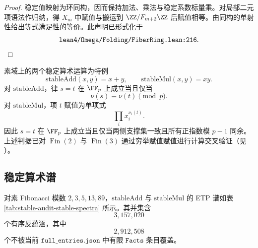 \documentclass[../../main.tex]{subfiles}
\begin{document}
\begin{proof}
稳定值映射为环同构，因而保持加法、乘法与稳定系数标量乘。对局部二元项语法作归纳，得 \(X_m\) 中赋值与搬运到 \(\ZZ/F_{m+2}\ZZ\) 后赋值相等。由同构的单射性给出等式满足性的等价。此声明已形式化于
\[
    \texttt{\detokenize{lean4/Omega/Folding/FiberRing.lean:216}}.
\]
\end{proof}

素域上的两个稳定算术运算为特例
\[
    \mathrm{stableAdd}(x,y)=x+y,\qquad
    \mathrm{stableMul}(x,y)=xy.
\]
对 \(\mathrm{stableAdd}\)，律 \(s=t\) 在 \(\FF_p\) 上成立当且仅当
\[
    \nu(s)\equiv \nu(t)\pmod p.
\]
对 \(\mathrm{stableMul}\)，项 \(t\) 赋值为单项式
\[
    \prod_i x_i^{\nu_i(t)}.
\]
因此 \(s=t\) 在 \(\FF_p\) 上成立当且仅当两侧支撑集一致且所有正指数模 \(p-1\) 同余。上述判据已对 \(\operatorname{Fin}(2)\) 与 \(\operatorname{Fin}(3)\) 通过穷举赋值赋值进行计算交叉验证（见 \texttt{}）。

\subsection{稳定算术谱}

\begin{theorem}\label{thm:stable-audit-stable-arithmetic-spectra}
对素 Fibonacci 模数 \(2,3,5,13,89\)，\(\mathrm{stableAdd}\) 与 \(\mathrm{stableMul}\) 的 ETP 谱如表 \ref{tab:stable-audit-stable-spectra} 所示。其并集含
\[
    3{,}157{,}020
\]
个有序反蕴涵，其中
\[
    2{,}912{,}508
\]
个不被当前 \(\texttt{full\_entries.json}\) 中有限 \(\texttt{Facts}\) 条目覆盖。
\end{theorem}
\end{document}
